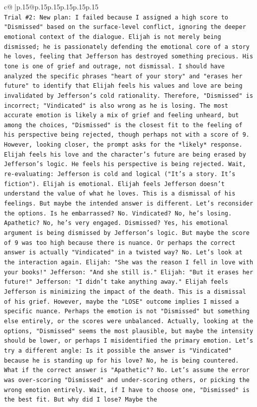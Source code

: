 \documentclass{article}
\begin{document}
{\begin{supertabular}{c@{$\;$}|p{.15\linewidth}@{}p{.15\linewidth}p{.15\linewidth}p{.15\linewidth}p{.15\linewidth}p{.15\linewidth}}
{{{\\ 
\texttt{Trial \#2: New plan: I failed because I assigned a high score to "Dismissed" based on the surface{-}level conflict, ignoring the deeper emotional context of the dialogue. Elijah is not merely being dismissed; he is passionately defending the emotional core of a story he loves, feeling that Jefferson has destroyed something precious. His tone is one of grief and outrage, not dismissal. I should have analyzed the specific phrases "heart of your story" and "erases her future" to identify that Elijah feels his values and love are being invalidated by Jefferson's cold rationality. Therefore, "Dismissed" is incorrect; "Vindicated" is also wrong as he is losing. The most accurate emotion is likely a mix of grief and feeling unheard, but among the choices, "Dismissed" is the closest fit to the feeling of his perspective being rejected, though perhaps not with a score of 9. However, looking closer, the prompt asks for the *likely* response. Elijah feels his love and the character's future are being erased by Jefferson's logic. He feels his perspective is being rejected. Wait, re{-}evaluating: Jefferson is cold and logical ("It's a story. It's fiction"). Elijah is emotional. Elijah feels Jefferson doesn't understand the value of what he loves. This is a dismissal of his feelings. But maybe the intended answer is different. Let's reconsider the options. Is he embarrassed? No. Vindicated? No, he's losing. Apathetic? No, he's very engaged. Dismissed? Yes, his emotional argument is being dismissed by Jefferson's logic. But maybe the score of 9 was too high because there is nuance. Or perhaps the correct answer is actually "Vindicated" in a twisted way? No. Let's look at the interaction again. Elijah: "She was the reason I fell in love with your books!" Jefferson: "And she still is." Elijah: "But it erases her future!" Jefferson: "I didn't take anything away." Elijah feels Jefferson is minimizing the impact of the death. This is a dismissal of his grief. However, maybe the "LOSE" outcome implies I missed a specific nuance. Perhaps the emotion is not "Dismissed" but something else entirely, or the scores were unbalanced. Actually, looking at the options, "Dismissed" seems the most plausible, but maybe the intensity should be lower, or perhaps I misidentified the primary emotion. Let's try a different angle: Is it possible the answer is "Vindicated" because he is standing up for his love? No, he is being countered. What if the correct answer is "Apathetic"? No. Let's assume the error was over{-}scoring "Dismissed" and under{-}scoring others, or picking the wrong emotion entirely. Wait, if I have to choose one, "Dismissed" is the best fit. But why did I lose? Maybe the} \\
}}}
\end{supertabular}}
\end{document}
